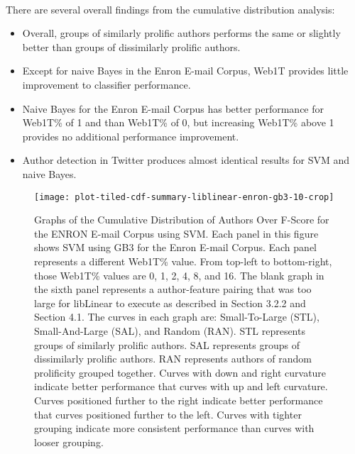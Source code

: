 	\paragraph*{} There are several overall findings from the cumulative distribution analysis:
	\begin{itemize}
	\item Overall, groups of similarly prolific authors performs the same or slightly better than groups of dissimilarly prolific authors.
	\item Except for naive Bayes in the Enron E-mail Corpus, Web1T provides little improvement to classifier performance.
	\item Naive Bayes for the Enron E-mail Corpus has better performance for Web1T\% of 1 and than Web1T\% of 0, but increasing Web1T\% above 1 provides no additional performance improvement.
	\item Author detection in Twitter produces almost identical results for SVM and naive Bayes.
	\end{itemize}
	
	\begin{figure}[htbp!]
		\begin{center}
		\centering
		\texttt{[image: plot-tiled-cdf-summary-liblinear-enron-gb3-10-crop]}
		\caption{Graphs of the Cumulative Distribution of Authors Over F-Score for the ENRON E-mail Corpus using SVM. Each panel in this figure shows SVM using GB3 for the Enron E-mail Corpus.  Each panel represents a different Web1T\% value.  From top-left to bottom-right, those Web1T\% values are 0, 1, 2, 4, 8, and 16.  The blank graph in the sixth panel represents a author-feature pairing that was too large for libLinear to execute as described in Section 3.2.2 and Section 4.1.  The curves in each graph are: Small-To-Large (STL), Small-And-Large (SAL), and Random (RAN).  STL represents groups of similarly prolific authors.  SAL represents groups of dissimilarly prolific authors.  RAN represents authors of random prolificity grouped together.  Curves with down and right curvature indicate better performance that curves with up and left curvature.  Curves positioned further to the right indicate better performance that curves positioned further to the left.  Curves with tighter grouping indicate more consistent performance than curves with looser grouping.}
		\label{fig:plot-tiled-cdf-summary-liblinear-enron-gb3-10}
		\end{center}
	\end{figure}
	
